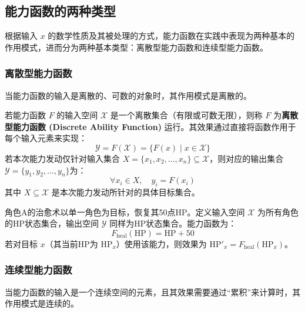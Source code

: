 \subsection{能力函数的两种类型}\label{subsec:discreteandcontinuous}

根据输入 $x$ 的数学性质及其被处理的方式，能力函数在实践中表现为两种基本的作用模式，进而分为两种基本类型：离散型能力函数和连续型能力函数。
\subsubsection{离散型能力函数}

当能力函数的输入是离散的、可数的对象时，其作用模式是离散的。

\begin{definition}[离散型能力函数]
    若能力函数 $F$ 的输入空间 $\mathcal{X}$ 是一个离散集合（有限或可数无限），则称 $F$ 为\textbf{离散型能力函数 (Discrete Ability Function)} 运行。其效果通过直接将函数作用于每个输入元素来实现：
    \begin{equation}
        \mathcal{Y} = F(\mathcal{X}) = \{F(x) \mid x \in \mathcal{X}\}
    \end{equation}
    若本次能力发动仅针对输入集合 $X = \{x_1, x_2, \ldots, x_n\} \subseteq \mathcal{X}$，则对应的输出集合\(\mathcal{Y} = \{y_1, y_2, \ldots, y_n\}\)为：
    \begin{equation}
        \forall x_i \in X, \quad y_i = F(x_i)
    \end{equation}
    其中 $X \subseteq \mathcal{X}$ 是本次能力发动所针对的具体目标集合。
\end{definition}

\begin{example}[单体治愈术]
    角色A的治愈术以单一角色为目标，恢复其50点HP。定义输入空间 $\mathcal{X}$ 为所有角色的HP状态集合，输出空间 $\mathcal{Y}$ 同样为HP状态集合。能力函数为：
    \begin{equation}
        F_{\text{heal}}(\text{HP}) = \text{HP} + 50
    \end{equation}
    若对目标 $x$（其当前HP为 $\text{HP}_x$）使用该能力，则效果为 $\text{HP}'_x = F_{\text{heal}}(\text{HP}_x)$。
\end{example}

\subsubsection{连续型能力函数}

当能力函数的输入是一个连续空间的元素，且其效果需要通过“累积”来计算时，其作用模式是连续的。

